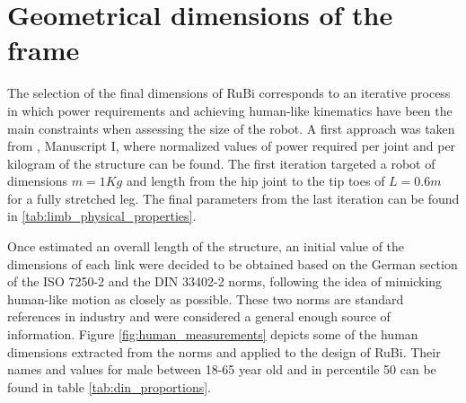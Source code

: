 
\section{Geometrical dimensions of the frame} %
\label{sec:dimensions}
The selection of the final dimensions of RuBi corresponds to an iterative process in which power requirements and achieving human-like kinematics have been the main constraints when assessing the size of the robot.
A first approach was taken from \cite{grimmer}, Manuscript I, where normalized values of power required per joint and per kilogram of the structure can be found.
The first iteration targeted a robot of dimensions $m = 1Kg$ and length from the hip joint to the tip toes of $L = 0.6 m$ for a fully stretched leg.
The final parameters from the last iteration can be found in \ref{tab:limb_physical_properties}.

Once estimated an overall length of the structure, an initial value of the dimensions of each link were decided to be obtained based on the German section of the ISO 7250-2 \cite{iso_measurements} and the DIN 33402-2 \cite{din_measurements1} norms, following the idea of mimicking human-like motion as closely as possible.
These two norms are standard references in industry and were considered a general enough source of information.
Figure \ref{fig:human_measurements} depicts some of the human dimensions extracted from the norms and applied to the design of RuBi.
Their names and values for male between 18-65 year old and in percentile 50 can be found in table \ref{tab:din_proportions}.

